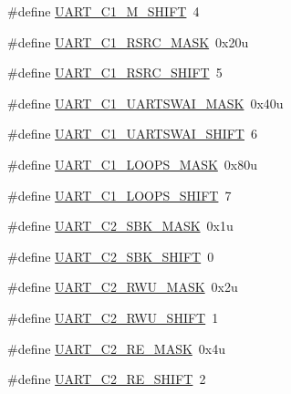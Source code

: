 \begin{DoxyCompactItemize}
\item 
\#define \hyperlink{group___u_a_r_t___register___masks_ga591070f161ecf5cf35b0e6927b5e4c77}{U\+A\+R\+T\+\_\+\+C1\+\_\+\+M\+\_\+\+S\+H\+I\+FT}~4
\item 
\#define \hyperlink{group___u_a_r_t___register___masks_gaaeb3cc3491cd77f71150bfa9cce03518}{U\+A\+R\+T\+\_\+\+C1\+\_\+\+R\+S\+R\+C\+\_\+\+M\+A\+SK}~0x20u
\item 
\#define \hyperlink{group___u_a_r_t___register___masks_gac773b486d570b26d17a7d522016f683a}{U\+A\+R\+T\+\_\+\+C1\+\_\+\+R\+S\+R\+C\+\_\+\+S\+H\+I\+FT}~5
\item 
\#define \hyperlink{group___u_a_r_t___register___masks_ga466f5bf7b0cd3c3517da3a6c6a9baaac}{U\+A\+R\+T\+\_\+\+C1\+\_\+\+U\+A\+R\+T\+S\+W\+A\+I\+\_\+\+M\+A\+SK}~0x40u
\item 
\#define \hyperlink{group___u_a_r_t___register___masks_gac7888d995fd947613eea08bdee534ffc}{U\+A\+R\+T\+\_\+\+C1\+\_\+\+U\+A\+R\+T\+S\+W\+A\+I\+\_\+\+S\+H\+I\+FT}~6
\item 
\#define \hyperlink{group___u_a_r_t___register___masks_ga08f1bbd905640d81967f9fb6d4ed8ec8}{U\+A\+R\+T\+\_\+\+C1\+\_\+\+L\+O\+O\+P\+S\+\_\+\+M\+A\+SK}~0x80u
\item 
\#define \hyperlink{group___u_a_r_t___register___masks_gac6beea8a7bad0b0fc3c3535f629fcf3a}{U\+A\+R\+T\+\_\+\+C1\+\_\+\+L\+O\+O\+P\+S\+\_\+\+S\+H\+I\+FT}~7
\item 
\#define \hyperlink{group___u_a_r_t___register___masks_ga8d243e5b3a3ece12bdeca818bacb15ee}{U\+A\+R\+T\+\_\+\+C2\+\_\+\+S\+B\+K\+\_\+\+M\+A\+SK}~0x1u
\item 
\#define \hyperlink{group___u_a_r_t___register___masks_ga94f62ff8a45a08ae54b40da725fb245b}{U\+A\+R\+T\+\_\+\+C2\+\_\+\+S\+B\+K\+\_\+\+S\+H\+I\+FT}~0
\item 
\#define \hyperlink{group___u_a_r_t___register___masks_ga279868a42acca3c1eeba8c53bb94b208}{U\+A\+R\+T\+\_\+\+C2\+\_\+\+R\+W\+U\+\_\+\+M\+A\+SK}~0x2u
\item 
\#define \hyperlink{group___u_a_r_t___register___masks_gaa163993d547a96c2ea002ff52e6b0971}{U\+A\+R\+T\+\_\+\+C2\+\_\+\+R\+W\+U\+\_\+\+S\+H\+I\+FT}~1
\item 
\#define \hyperlink{group___u_a_r_t___register___masks_ga181a8e8fd0f780d45f1bff7c76836fe5}{U\+A\+R\+T\+\_\+\+C2\+\_\+\+R\+E\+\_\+\+M\+A\+SK}~0x4u
\item 
\#define \hyperlink{group___u_a_r_t___register___masks_ga65bf907ff7aaa0afeb5a3c34ff3a4b2c}{U\+A\+R\+T\+\_\+\+C2\+\_\+\+R\+E\+\_\+\+S\+H\+I\+FT}~2
\item 

\end{DoxyCompactItemize}
